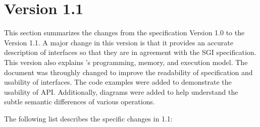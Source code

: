 \section{Version 1.1}
This section summarizes the changes from the \openshmem specification Version 1.0 to the Version 1.1.  
A major change in this version is that it provides an accurate description of \openshmem interfaces so that they are in agreement with the SGI specification.  This version also explains \openshmem’s programming, memory, and execution model.  The document was throughly changed to improve the readability of specification and usability of interfaces.  The code examples were added to demonstrate the usability of API. Additionally, diagrams were added to help understand the subtle semantic differences of various operations.


The following list describes the specific changes in 1.1:%

